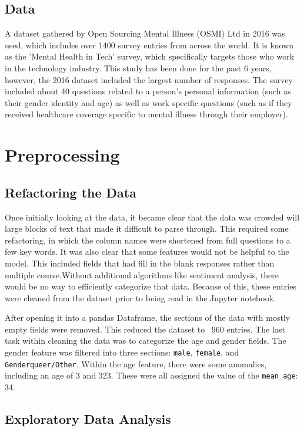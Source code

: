 \documentclass{article}
\begin{document}
\subsection{Data}

A dataset gathered by Open Sourcing Mental Illness (OSMI) Ltd in 2016 was used, which includes over 1400 survey entries from across the world. It is known as the 'Mental Health in Tech' survey, which specifically targets those who work in the technology industry. This study has been done for the past 6 years, however, the 2016 dataset included the largest number of responses. The survey included about 40 questions related to a person's personal information (such as their gender identity and age) as well as work specific questions (such as if they received healthcare coverage specific to mental illness through their employer).

\section{Preprocessing} 

\subsection{Refactoring the Data}
 
Once initially looking at the data, it became clear that the data was crowded will large blocks of text that made it difficult to parse through. This required some refactoring, in which the column names were shortened from full questions to a few key words. It was also clear that some features would not be helpful to the model. This included fields that had fill in the blank responses rather than multiple course.Without additional algorithms like sentiment analysis, there would be no way to efficiently categorize that data. Because of this, these entries were cleaned from the dataset prior to being read in the Jupyter notebook.

After opening it into a pandas Dataframe, the sections of the data with mostly empty fields were removed. This reduced the dataset to ~960 entries. The last task within cleaning the data was to categorize the age and gender fields. The gender feature was filtered into three sections: {\tt male}, {\tt female}, and {\tt Genderqueer/Other}. Within the age feature, there were some anomalies, including an age of 3 and 323. These were all assigned the value of the {\tt mean\_age}: 34.  

\subsection{Exploratory Data Analysis}
\end{document}
